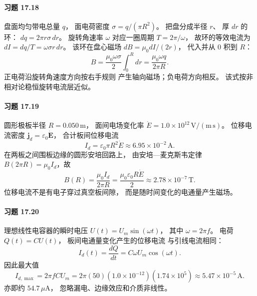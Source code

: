\paragraph{习题 17.18}
盘面均匀带电总量 \(q\)，
面电荷密度
\(\sigma=q/(\pi R^2)\)。
把盘分成半径 \(r\)、
厚 \(dr\) 的环：
\(dq=2\pi r\sigma\,dr\)。
旋转角速率 \(\omega\)
对应一圈周期 \(T=2\pi/\omega\)，
故环的等效电流为
\(dI=dq/T=\omega\sigma r\,dr\)。
该环在盘心磁场
\(dB=\mu_0dI/(2r)\)，
代入并从 \(0\) 积到 \(R\)：
\[
 \boxed{B=\frac{\mu_0\omega\sigma}{2}
 \int_0^Rdr
 =\frac{\mu_0\omega q}{2\pi R}}.
\]
正电荷沿旋转角速度方向按右手规则
产生轴向磁场；负电荷方向相反。
该式按非相对论稳恒旋转电流层近似。

\paragraph{习题 17.19}
圆形极板半径
\(R=0.050\,\mathrm m\)，
面间电场变化率
\(\dot E=1.0\times10^{12}\,
\mathrm{V/(m\,s)}\)。
位移电流密度
\(\boldsymbol j_d=\varepsilon_0\dot{\boldsymbol E}\)，
合计板间位移电流
\[
 \boxed{I_d=\varepsilon_0\pi R^2\dot E
 \approx6.95\times10^{-2}\,\mathrm A}.
\]
在两板之间围板边缘的圆形安培回路上，
由安培—麦克斯韦定律
\(B(2\pi R)=\mu_0I_d\)，故
\[
 \boxed{B(R)=\frac{\mu_0I_d}{2\pi R}
 =\frac{\mu_0\varepsilon_0R\dot E}{2}
 \approx2.78\times10^{-7}\,\mathrm T}.
\]
位移电流不是有电子穿过真空板间隙，
而是随时间变化的电通量产生磁场。

\paragraph{习题 17.20}
理想线性电容器的瞬时电压
\(U(t)=U_m\sin(\omega t)\)，
其中
\(\omega=2\pi f\)。
电荷
\(Q(t)=CU(t)\)，
板间电通量变化产生的位移电流
与引线电流相同：
\[
 I_d(t)=\frac{dQ}{dt}
 =C\omega U_m\cos(\omega t).
\]
因此最大值
\[
 \boxed{I_{d,\max}=2\pi fCU_m
 =2\pi(50)(1.0\times10^{-12})
 (1.74\times10^5)
 \approx5.47\times10^{-5}\,\mathrm A}.
\]
亦即约
\(54.7\,\mu\mathrm A\)，
忽略漏电、边缘效应和介质非线性。
